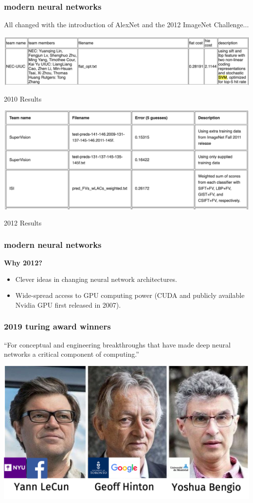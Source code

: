 \documentclass[handout,compress]{beamer}
\begin{document}
\begin{frame}
	\frametitle{modern neural networks}
	\small
	All changed with the introduction of AlexNet and the 2012 ImageNet Challenge...
	\begin{center}
		\includegraphics[width=.7\textwidth]{imagenet2010.png}
		
		2010 Results
	\end{center}
	\begin{center}
	\includegraphics[width=.7\textwidth]{imagenet2012.png}
	
	2012 Results
	\end{center}
\end{frame}

\begin{frame}
	\frametitle{modern neural networks}
	\textbf{Why 2012?}
	\begin{itemize}
		\item Clever ideas in changing neural network architectures. 
		\item Wide-spread access to GPU computing power (CUDA and publicly available Nvidia GPU first released in 2007).
	\end{itemize}
\end{frame}

\begin{frame}
	\frametitle{2019 turing award winners}
	\small
``For conceptual and engineering breakthroughs that have made deep neural networks a critical component of computing.''
		\begin{center}
		\includegraphics[width=.7\textwidth]{turing_annotate.png}
	\end{center}
\end{frame}
\end{document}
